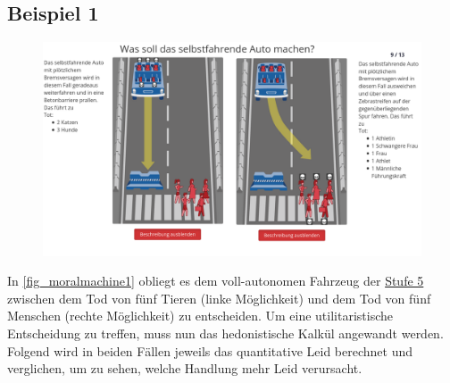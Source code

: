 \documentclass[a4paper, 12pt, openany]{book}
\begin{document}
            \subsection{Beispiel 1}
                \begin{figure}[h!]
                    \centering
                    \includegraphics[scale=0.4]{mm1.png} 
                    \caption{\cite{fig_moralmachine1}}
                    \label{fig_moralmachine1}
                \end{figure}    
                    
                In \autoref{fig_moralmachine1} obliegt es dem voll-autonomen Fahrzeug der \hyperref[5stufen]{Stufe 5} zwischen dem Tod von fünf Tieren (linke Möglichkeit) und dem Tod von fünf Menschen (rechte Möglichkeit) zu entscheiden. Um eine utilitaristische Entscheidung zu treffen, muss nun das hedonistische Kalkül angewandt werden. Folgend wird in beiden Fällen jeweils das quantitative Leid berechnet und verglichen, um zu sehen, welche Handlung mehr Leid verursacht.
\end{document}
